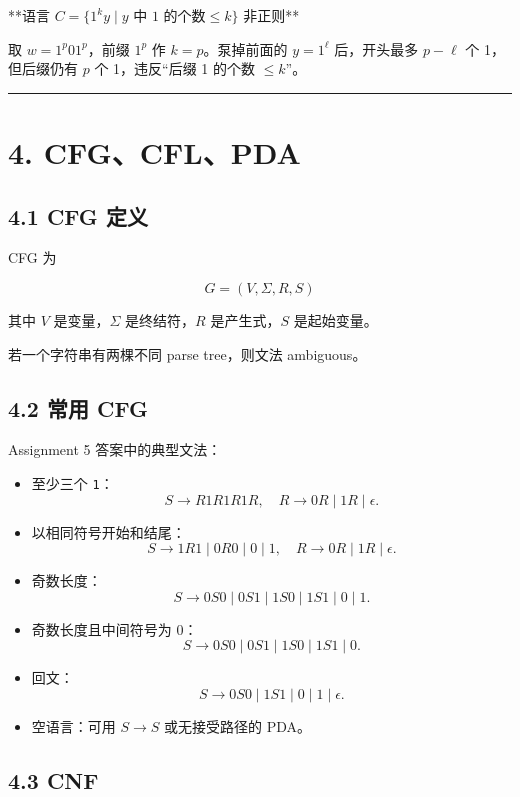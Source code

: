 ﻿\documentclass[UTF8,11pt]{ctexart}
\begin{document}
**语言 \(C=\{1^k y\mid y\text{ 中 1 的个数}\le k\}\) 非正则**


取 \(w=1^p01^p\)，前缀 \(1^p\) 作 \(k=p\)。泵掉前面的 \(y=1^\ell\) 后，开头最多 \(p-\ell\) 个 1，但后缀仍有 \(p\) 个 1，违反“后缀 1 的个数 \(\le k\)”。


\bigskip\hrule\bigskip


\section{4. CFG、CFL、PDA}


\subsection{4.1 CFG 定义}


CFG 为

\[
G=(V,\Sigma,R,S)
\]

其中 \(V\) 是变量，\(\Sigma\) 是终结符，\(R\) 是产生式，\(S\) 是起始变量。  

若一个字符串有两棵不同 parse tree，则文法 ambiguous。


\subsection{4.2 常用 CFG}


Assignment 5 答案中的典型文法：


\begin{itemize}
\item 至少三个 \texttt{1}：
\[
  S\to R1R1R1R,\quad R\to0R\mid1R\mid\epsilon.
  \]

\item 以相同符号开始和结尾：
\[
  S\to1R1\mid0R0\mid0\mid1,\quad R\to0R\mid1R\mid\epsilon.
  \]

\item 奇数长度：
\[
  S\to0S0\mid0S1\mid1S0\mid1S1\mid0\mid1.
  \]

\item 奇数长度且中间符号为 0：
\[
  S\to0S0\mid0S1\mid1S0\mid1S1\mid0.
  \]

\item 回文：
\[
  S\to0S0\mid1S1\mid0\mid1\mid\epsilon.
  \]

\item 空语言：可用 \(S\to S\) 或无接受路径的 PDA。
\end{itemize}


\subsection{4.3 CNF}
\end{document}
